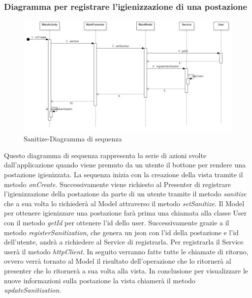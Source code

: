 \subsubsection{Diagramma per registrare l'igienizzazione di una postazione} 
\begin{figure}[H]
	\centering
	\includegraphics[width=16cm]{res/images/apputenti-mainSanitizeSeq.png}
	\caption{Sanitize-Diagramma di sequenza}
	\label{fig:Sanitize-Diagramma di sequenza}
\end{figure}
Questo diagramma di sequenza rappresenta la serie di azioni svolte dall'applicazione quando viene premuto da un utente il bottone per rendere una postazione igienizzata.
La sequenza inizia con la creazione della vista tramite il metodo \textit{onCreate}.
Successivamente viene richiesto al Presenter di registrare l'igienizzazione della postazione da parte di un utente tramite il metodo \textit{sanitize} che a sua volta lo richiederà al Model attraverso il metodo \textit{setSanitize}.
Il Model per ottenere igienizzare una postazione farà prima una chiamata alla classe User con il metodo \textit{getId} per ottenere l'id dello user.
Successivamente grazie a il metodo \textit{registerSanitization}, che genera un json con l'id della postazione e l'id dell'utente, andrà a richiedere al Service di registrarla. Per registrarla il Service userà il metodo \textit{httpClient}.
In seguito verranno fatte tutte le chiamate di ritorno, ovvero verrà tornato al Model il risultato dell'operazione che lo ritornerà al presenter che lo ritornerà a sua volta alla vista.
In conclusione per visualizzare le nuove informazioni sulla postazione la vista chiamerà il metodo \textit{updateSanitization}.

